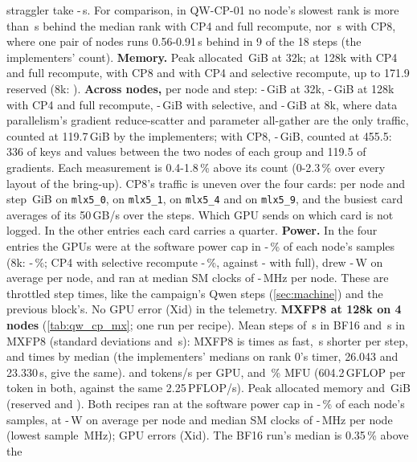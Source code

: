 straggler take \TriQwCpCleanLo-\TriQwCpCleanHi\,s. For comparison, in QW-CP-01 no node's slowest rank is more than \TriQwCpBehindFull\,s behind the median rank with CP4 and full recompute, nor \TriQwCpBehindEight\,s with CP8, where one pair of nodes runs 0.56-0.91\,s behind in 9 of the 18 steps (the implementers' count). \textbf{Memory.} Peak allocated \TriQwCpMemThirtyTwo\,GiB at 32k; at 128k \TriQwCpMemCpFour{} with CP4 and full recompute, \TriQwCpMemCpEight{} with CP8 and \TriQwCpMemCpFourSel{} with CP4 and selective recompute, up to 171.9 reserved (8k: \TriQwCpMemRef). \textbf{Across nodes,} per node and step: \TriQwCpIbLoThirtyTwo-\TriQwCpIbHiThirtyTwo\,GiB at 32k, \TriQwCpIbLoCpFour-\TriQwCpIbHiCpFour\,GiB at 128k with CP4 and full recompute, \TriQwCpIbLoCpFourSel-\TriQwCpIbHiCpFourSel\,GiB with selective, and \TriQwCpIbLoRef-\TriQwCpIbHiRef\,GiB at 8k, where data parallelism's gradient reduce-scatter and parameter all-gather are the only traffic, counted at 119.7\,GiB by the implementers; with CP8, \TriQwCpIbLoCpEight-\TriQwCpIbHiCpEight\,GiB, counted at 455.5: 336 of keys and values between the two nodes of each group and 119.5 of gradients. Each measurement is 0.4-1.8\,\% above its count (0-2.3\,\% over every layout of the bring-up). CP8's traffic is uneven over the four cards: per node and step \TriQwCpPortZero\,GiB on \texttt{mlx5\_0}, \TriQwCpPortOne{} on \texttt{mlx5\_1}, \TriQwCpPortFour{} on \texttt{mlx5\_4} and \TriQwCpPortNine{} on \texttt{mlx5\_9}, and the busiest card averages \TriQwCpPortBusy{} of its 50\,GB/s over the steps. Which GPU sends on which card is not logged. In the other entries each card carries a quarter. \textbf{Power.} In the four entries the GPUs were at the software power cap in \TriQwCpCapLo-\TriQwCpCapHi\,\% of each node's samples (8k: \TriQwCpCapLoRef-\TriQwCpCapHiRef\,\%; CP4 with selective recompute \TriQwCpCapLoCpFourSel-\TriQwCpCapHiCpFourSel\,\%, against \TriQwCpCapLoCpFour-\TriQwCpCapHiCpFour{} with full), drew \TriQwCpPowerLo-\TriQwCpPowerHi\,W on average per node, and ran at median SM clocks of \TriQwCpSmLo-\TriQwCpSmHi\,MHz per node. These are throttled step times, like the campaign's Qwen steps (\cref{sec:machine}) and the previous block's. No GPU error (Xid) in the telemetry. \textbf{MXFP8 at 128k on 4 nodes} (\cref{tab:qw_cp_mx}; one run per recipe). Mean steps of \TriQwCpMxStepBf\,s in BF16 and \TriQwCpMxStepMx\,s in MXFP8 (standard deviations \TriQwCpMxSdBf{} and \TriQwCpMxSdMx\,s): MXFP8 is \TriQwCpMxSpeedup{} times as fast, \TriQwCpMxSaved\,s shorter per step, and \TriQwCpMxSpeedupMed{} times by median (the implementers' medians on rank 0's timer, 26.043 and 23.330\,s, give the same). \TriQwCpMxTokBf{} and \TriQwCpMxTokMx{} tokens/s per GPU, \TriQwCpMxMfuBf{} and \TriQwCpMxMfuMx\,\% MFU (604.2\,GFLOP per token in both, against the same 2.25\,PFLOP/s). Peak allocated memory \TriQwCpMxMemBf{} and \TriQwCpMxMemMx\,GiB (reserved \TriQwCpMxResBf{} and \TriQwCpMxResMx). Both recipes ran at the software power cap in \TriQwCpMxCapLo-\TriQwCpMxCapHi\,\% of each node's samples, at \TriQwCpMxPowerLo-\TriQwCpMxPowerHi\,W on average per node and median SM clocks of \TriQwCpMxSmLo-\TriQwCpMxSmHi\,MHz per node (lowest sample \TriQwCpMxSmMin\,MHz); \TriQwCpMxXid{} GPU errors (Xid). The BF16 run's median is 0.35\,\% above the 